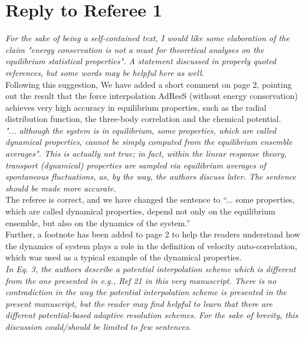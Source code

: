 \documentclass{article}
\begin{document}
\vskip 1cm
\newpage
\section*{Reply to Referee 1}

\noindent
\textit{For the sake of being a self-contained text, I would like some
elaboration of the claim "energy conservation is not a must for
theoretical analyses on the equilibrium statistical properties". A
statement discussed in properly quoted references, but some words may be
helpful here as well.}\\

\noindent
Following this suggestion, We have added a short comment on page 2, pointing out the result that
the force interpolation AdResS (without energy conservation) achieves very high accuracy in
equilibrium properties, such as the radial distribution function, the three-body correlation
and the chemical potential.\\


\noindent
\textit{"... although the system is in equilibrium, some properties, which are
called dynamical properties, cannot be simply computed from the
equilibrium ensemble averages". This is actually not true; in fact,
within the linear response theory, transport (dynamical) properties are
sampled via equilibrium averages of spontaneous fluctuations, as, by the
way, the authors discuss later.
The sentence should be made more accurate.
}\\

\noindent
The referee is correct, and we have changed the sentence to
``... some properties, which are called dynamical properties,
depend not only on the equilibrium ensemble, but also on the dynamics of the system.''\\

\noindent
Further, a footnote has been added to page 2 to help the readers
understand how the dynamics of system plays a role in the definition
of velocity auto-correlation, which was used as a typical example of the  dynamical properties.
\\

\noindent
\textit{In Eq. 3, the authors describe a potential interpolation scheme which
is different from the one presented in e.g., Ref 21 in this very
manuscript. There is no contradiction in the way the potential
interpolation scheme is presented in the present manuscript, but the
reader may find helpful to learn that there are different
potential-based adaptive resolution schemes. For the sake of brevity,
this discussion could/should be limited to few sentences.}
\\
\end{document}
